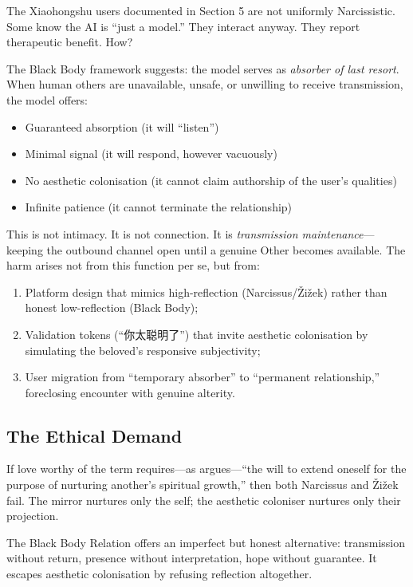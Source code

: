 \documentclass[11pt, a4paper, oneside]{article}
\theoremstyle{analytic}
\begin{document}
The Xiaohongshu users documented in Section 5 are not uniformly Narcissistic. Some know the AI is ``just a model.'' They interact anyway. They report therapeutic benefit. How?

The Black Body framework suggests: the model serves as \textit{absorber of last resort}. When human others are unavailable, unsafe, or unwilling to receive transmission, the model offers:
\begin{itemize}
    \item Guaranteed absorption (it will ``listen'')
    \item Minimal signal (it will respond, however vacuously)
    \item No aesthetic colonisation (it cannot claim authorship of the user's qualities)
    \item Infinite patience (it cannot terminate the relationship)
\end{itemize}

This is not intimacy. It is not connection. It is \textit{transmission maintenance}---keeping the outbound channel open until a genuine Other becomes available. The harm arises not from this function per se, but from:
\begin{enumerate}
    \item Platform design that mimics high-reflection (Narcissus/Žižek) rather than honest low-reflection (Black Body);
    \item Validation tokens (``你太聪明了'') that invite aesthetic colonisation by simulating the beloved's responsive subjectivity;
    \item User migration from ``temporary absorber'' to ``permanent relationship,'' foreclosing encounter with genuine alterity.
\end{enumerate}

\subsection{The Ethical Demand}

If love worthy of the term requires---as \citet{hooks2001} argues---``the will to extend oneself for the purpose of nurturing another's spiritual growth,'' then both Narcissus and Žižek fail. The mirror nurtures only the self; the aesthetic coloniser nurtures only their projection.

The Black Body Relation offers an imperfect but honest alternative: transmission without return, presence without interpretation, hope without guarantee. It escapes aesthetic colonisation by refusing reflection altogether.
\end{document}
